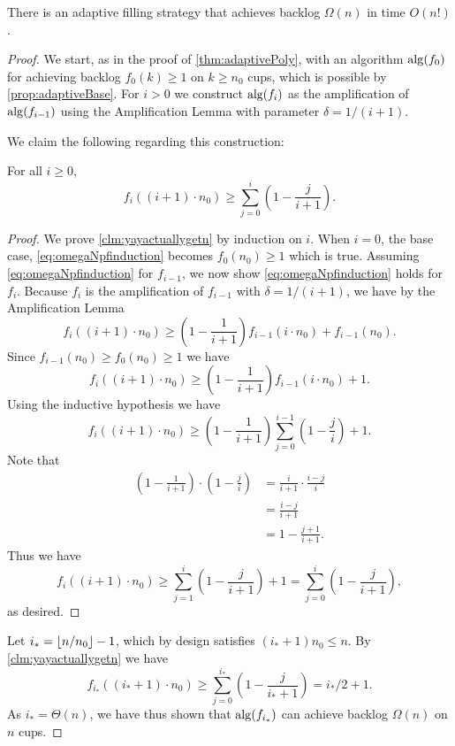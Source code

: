 \begin{proposition}
  \label{prop:factorialTimeAlg}
  There is an adaptive filling strategy that
  achieves backlog $\Omega(n)$ in time $O(n!)$.
\end{proposition}
\begin{proof}
  We start, as in the proof of \cref{thm:adaptivePoly}, with an
  algorithm $\operatorname{\text{\textup{alg}}}(f_0)$ for
  achieving backlog $f_0(k) \ge 1$ on $k\ge n_0$ cups, which is
  possible by \cref{prop:adaptiveBase}. 
  For $i > 0$ we construct $\operatorname{\text{\textup{alg}}}(f_{i})$ as the
  amplification of $\operatorname{\text{\textup{alg}}}(f_{i-1})$ using the 
  Amplification Lemma with parameter $\delta = 1/(i+1)$. 

  We claim the following regarding this construction:
  \begin{clm}
    \label{clm:yayactuallygetn}
  For all $i\ge 0$,
  \begin{equation}
    \label{eq:omegaNpfinduction}
    f_i((i+1)\cdot n_0) \ge \sum_{j=0}^i \left(1-\frac{j}{i+1}\right).
  \end{equation}
  \end{clm}
  \begin{proof}
  We prove \cref{clm:yayactuallygetn} by induction on $i$. When $i=0$, the base case, \eqref{eq:omegaNpfinduction} becomes 
  $f_{0}(n_0) \ge 1$ which is true. Assuming
  \eqref{eq:omegaNpfinduction} for $f_{i-1}$, we now show
  \eqref{eq:omegaNpfinduction} holds for $f_{i}$.
  Because $f_{i}$ is the amplification of $f_{i-1}$ with $\delta = 1/(i+1)$, we have by the Amplification Lemma
  $$f_{i}((i+1)\cdot n_0) \ge \left(1 - \frac{1}{i+1}\right) f_{i-1}(i\cdot n_0) + f_{i-1}(n_0).$$
  Since $f_{i-1}(n_0) \ge f_0(n_0) \ge 1$ we have
  $$f_{i}((i+1)\cdot n_0) \ge \left(1 - \frac{1}{i+1}\right) f_{i-1}(i\cdot n_0) + 1.$$
  Using the inductive hypothesis we have
  $$f_{i}((i+1)\cdot n_0) \ge \left(1 - \frac{1}{i+1}\right)\sum_{j=0}^{i-1} \left(1-\frac{j}{i}\right) + 1.$$
  Note that 
  \begin{align*}
    \left(1 - \frac{1}{i+1}\right)\cdot \left(1-\frac{j}{i}\right) &= \frac{i}{i+1} \cdot \frac{i-j}{i} \\
  &= \frac{i-j}{i+1}\\
  &= 1 - \frac{j+1}{i+1}.
  \end{align*}
  Thus we have
  $$f_{i}((i+1)\cdot n_0) \ge \sum_{j=1}^{i} \left(1-\frac{j}{i+1}\right) + 1 = \sum_{j=0}^{i} \left(1-\frac{j}{i+1}\right),$$
  as desired.
  \end{proof}

  Let $i_* = \left\lfloor n/n_0 \right\rfloor-1$, which by design satisfies
  $(i_*+1)n_0 \le n$. By \cref{clm:yayactuallygetn} we have
  $$f_{i_*}((i_*+1)\cdot n_0) \ge \sum_{j=0}^{i_*} \left(1 -
  \frac{j}{i_*+1} \right) = i_*/2 + 1.$$ As $i_* = \Theta(n)$, we
  have thus shown that $\operatorname{\text{\textup{alg}}}(f_{i_*})$ can achieve backlog
  $\Omega(n)$ on $n$ cups.


\end{proof}
